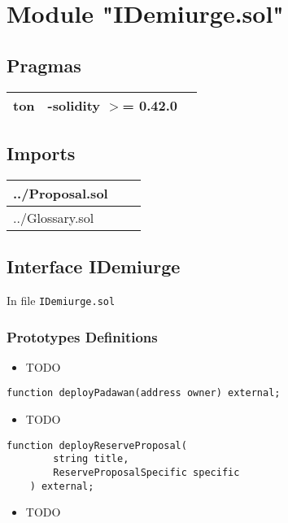 
\section{Module "IDemiurge.sol"}


\subsection{Pragmas}


\noindent\begin{tabular}{|l|l|p{5cm}|}\hline
ton & -solidity $>$= 0.42.0 &\\\hline
\end{tabular}


\subsection{Imports}


\noindent\begin{tabular}{|l|l|p{5cm}|}\hline
../Proposal.sol &\\\hline
../Glossary.sol &\\\hline
\end{tabular}


\subsection{Interface IDemiurge}

\minitoc

In file {\tt IDemiurge.sol}

\subsubsection{Prototypes Definitions}

\begin{itemize}
\item TODO
\end{itemize}

\begin{lstlisting}[firstnumber=7]
    function deployPadawan(address owner) external;
\end{lstlisting}
\begin{itemize}
\item TODO
\end{itemize}

\begin{lstlisting}[firstnumber=10]
    function deployReserveProposal(
        string title,
        ReserveProposalSpecific specific
    ) external;
\end{lstlisting}
\begin{itemize}
\item TODO
\end{itemize}

